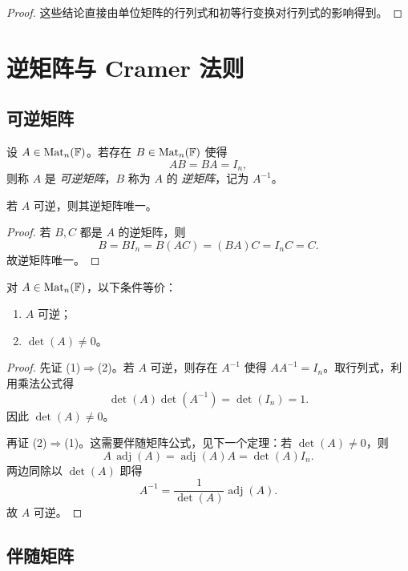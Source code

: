 \begin{proof}
这些结论直接由单位矩阵的行列式和初等行变换对行列式的影响得到。
\end{proof}

\section{逆矩阵与 Cramer 法则}

\subsection{可逆矩阵}

\begin{definition}
设 $A\in\mathrm{Mat}_n(\mathbb{F})$。若存在 $B\in\mathrm{Mat}_n(\mathbb{F})$ 使得
\[
AB=BA=I_n,
\]
则称 $A$ 是 \emph{可逆矩阵}，$B$ 称为 $A$ 的 \emph{逆矩阵}，记为 $A^{-1}$。
\end{definition}

\begin{proposition}[逆矩阵的唯一性]
若 $A$ 可逆，则其逆矩阵唯一。
\end{proposition}

\begin{proof}
若 $B,C$ 都是 $A$ 的逆矩阵，则
\[
B=BI_n=B(AC)=(BA)C=I_nC=C.
\]
故逆矩阵唯一。
\end{proof}

\begin{theorem}[可逆判别准则]
对 $A\in\mathrm{Mat}_n(\mathbb{F})$，以下条件等价：
\begin{enumerate}[label=(\arabic*)]
  \item $A$ 可逆；
  \item $\det(A)\ne 0$。
\end{enumerate}
\end{theorem}

\begin{proof}
先证 (1)$\Rightarrow$(2)。若 $A$ 可逆，则存在 $A^{-1}$ 使得 $AA^{-1}=I_n$。取行列式，利用乘法公式得
\[
\det(A)\det(A^{-1})=\det(I_n)=1.
\]
因此 $\det(A)\ne 0$。

再证 (2)$\Rightarrow$(1)。这需要伴随矩阵公式，见下一个定理：若 $\det(A)\ne 0$，则
\[
A\,\operatorname{adj}(A)=\operatorname{adj}(A)A=\det(A)I_n.
\]
两边同除以 $\det(A)$ 即得
\[
A^{-1}=\frac{1}{\det(A)}\operatorname{adj}(A).
\]
故 $A$ 可逆。
\end{proof}

\subsection{伴随矩阵}

